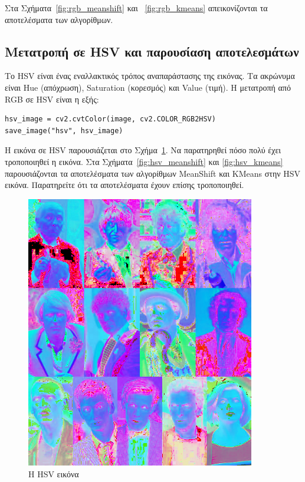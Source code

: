 Στα Σχήματα~\ref{fig:rgb_meanshift} και ~\ref{fig:rgb_kmeans} απεικονίζονται τα αποτελέσματα των αλγορίθμων.

\subsection{Μετατροπή σε HSV και παρουσίαση αποτελεσμάτων}

Το HSV είναι ένας εναλλακτικός τρόπος αναπαράστασης της εικόνας. Τα ακρώνυμα είναι Hue (απόχρωση), Saturation (κορεσμός) και Value (τιμή). Η μετατροπή από RGB σε HSV είναι η εξής:

\begin{verbatim}
hsv_image = cv2.cvtColor(image, cv2.COLOR_RGB2HSV)
save_image("hsv", hsv_image)
\end{verbatim}

Η εικόνα σε HSV παρουσιάζεται στο Σχήμα~\ref{fig:hsv}. Να παρατηρηθεί πόσο πολύ έχει τροποποιηθεί η εικόνα. Στα Σχήματα~\ref{fig:hsv_meanshift} και \ref{fig:hsv_kmeans} παρουσιάζονται τα αποτελέσματα των αλγορίθμων MeanShift και KMeans στην HSV εικόνα. Παρατηρείτε ότι τα αποτελέσματα έχουν επίσης τροποποιηθεί.

\begin{figure}[H]
  \centering
  \includegraphics[width=100mm]{Figures/hsv}
  \caption{Η HSV εικόνα}
  \label{fig:hsv}
\end{figure}


